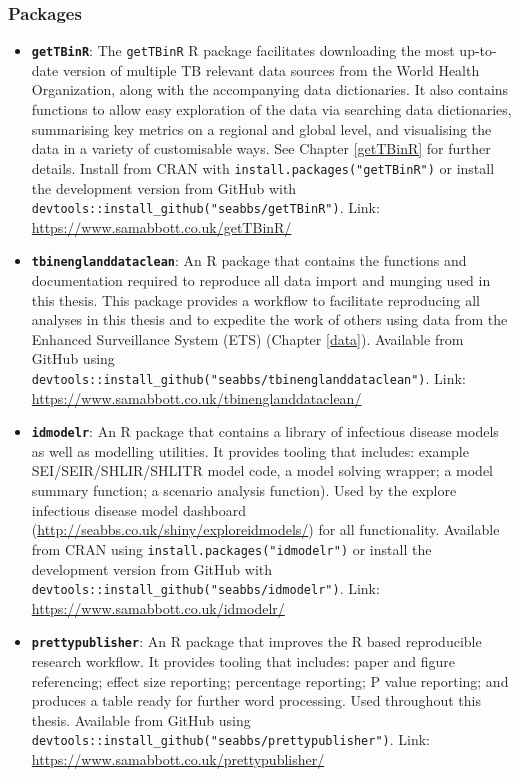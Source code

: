 \documentclass[11pt,twoside]{bristolthesis}
\begin{document}
  \hypertarget{packages}{%
  \subsubsection{Packages}\label{packages}}
  \begin{itemize}
  \item
    \textbf{\texttt{getTBinR}}: The \texttt{getTBinR} R package facilitates downloading the most up-to-date version of multiple TB relevant data sources from the World Health Organization, along with the accompanying data dictionaries. It also contains functions to allow easy exploration of the data via searching data dictionaries, summarising key metrics on a regional and global level, and visualising the data in a variety of customisable ways. See Chapter \ref{getTBinR} for further details. Install from CRAN with \texttt{install.packages("getTBinR")} or install the development version from GitHub with \texttt{devtools::install\_github("seabbs/getTBinR")}. Link: \url{https://www.samabbott.co.uk/getTBinR/}
  \item
    \textbf{\texttt{tbinenglanddataclean}}: An R package that contains the functions and documentation required to reproduce all data import and munging used in this thesis. This package provides a workflow to facilitate reproducing all analyses in this thesis and to expedite the work of others using data from the Enhanced Surveillance System (ETS) (Chapter \ref{data}). Available from GitHub using \texttt{devtools::install\_github("seabbs/tbinenglanddataclean")}. Link: \url{https://www.samabbott.co.uk/tbinenglanddataclean/}
  \item
    \textbf{\texttt{idmodelr}}: An R package that contains a library of infectious disease models as well as modelling utilities. It provides tooling that includes: example SEI/SEIR/SHLIR/SHLITR model code, a model solving wrapper; a model summary function; a scenario analysis function). Used by the explore infectious disease model dashboard (\url{http://seabbs.co.uk/shiny/exploreidmodels/}) for all functionality. Available from CRAN using \texttt{install.packages("idmodelr")} or install the development version from GitHub with \texttt{devtools::install\_github("seabbs/idmodelr")}. Link: \url{https://www.samabbott.co.uk/idmodelr/}
  \item
    \textbf{\texttt{prettypublisher}}: An R package that improves the R based reproducible research workflow. It provides tooling that includes: paper and figure referencing; effect size reporting; percentage reporting; P value reporting; and produces a table ready for further word processing. Used throughout this thesis. Available from GitHub using \texttt{devtools::install\_github("seabbs/prettypublisher")}. Link: \url{https://www.samabbott.co.uk/prettypublisher/}
  \end{itemize}
\end{document}
